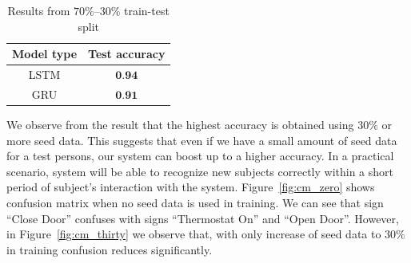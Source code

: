 \documentclass[10pt,twocolumn,letterpaper]{article}
\begin{document}
\begin{table}[h]
	\begin{center}
		\begin{tabular}{|c|c|}
			\hline
			Model type & Test accuracy\\
			\hline\hline
			LSTM & $\textbf{0.94}$\\
			\hline
			GRU & $\textbf{0.91}$\\
			\hline
		\end{tabular}
	\end{center}
	\caption{Results from $70\%$--$30\%$ train-test split}
	\label{table:result_conv}
\end{table}
%		
We observe from the result that the highest accuracy is obtained using $30\%$ or more seed data. This suggests that even if we have a small amount of seed data for a test persons, our system can boost up to a higher accuracy. In a practical scenario, system will be able to recognize new subjects correctly within a short period of subject's interaction with the system. 
Figure~\ref{fig:cm_zero} shows confusion matrix when no seed data is used in training. We can see that sign ``Close Door'' confuses with signs ``Thermostat On'' and ``Open Door''. However, in Figure~\ref{fig:cm_thirty} we observe that, with only increase of seed data to $30\%$ in training confusion reduces significantly. 
\end{document}
